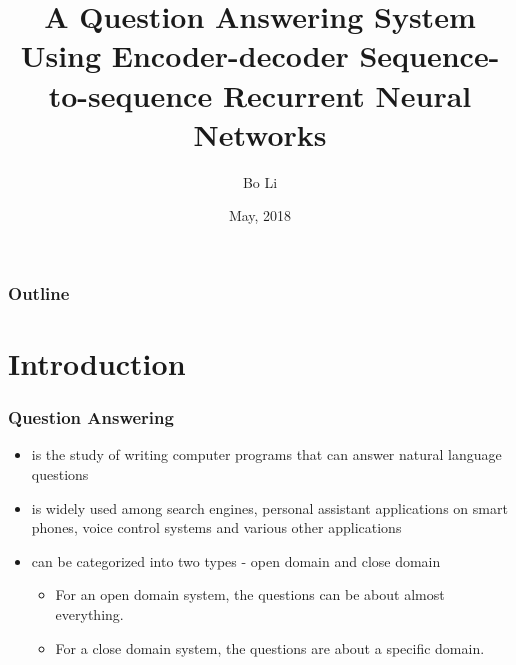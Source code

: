 \documentclass{beamer}
\begin{document}
\raggedright

\title{A Question Answering System Using Encoder-decoder Sequence-to-sequence Recurrent Neural Networks}
\author{Bo Li}
\date{May, 2018}

\begin{frame}
\titlepage

\end{frame}

\begin{frame}

  \frametitle{Outline}

  \tableofcontents[hideallsubsections]

\end{frame}



\section{Introduction}

\begin{frame} \frametitle{Question Answering}
    \begin{itemize}
        \item is the study of writing computer programs that can answer natural language questions
        \item is widely used among search engines, personal assistant applications on smart phones, voice control systems and various other applications
        \item  can be categorized into two types - open domain and close domain
            \begin{itemize}
                \item  For an open domain system, the questions can be about almost everything.
                \item For a close domain system, the questions are about a specific domain.
            \end{itemize}
    \end{itemize}
\end{frame}
\end{document}
